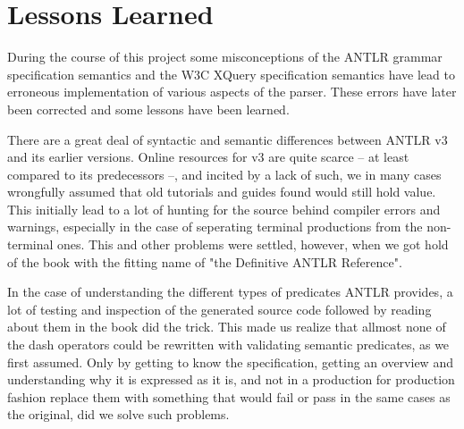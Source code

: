 \section{Lessons Learned}
\label{sect:discussion:deadEnds}
During the course of this project some misconceptions of the ANTLR grammar specification semantics and the W3C XQuery specification semantics have lead to erroneous implementation of various aspects of the parser. These errors have later been corrected and some lessons have been learned.

There are a great deal of syntactic and semantic differences between ANTLR v3 and its earlier versions. Online resources for v3 are quite scarce -- at least compared to its predecessors --, and incited by a lack of such, we in many cases wrongfully assumed that old tutorials and guides found would still hold value. This initially lead to a lot of hunting for the source behind compiler errors and warnings, especially in the case of seperating terminal productions from the non-terminal ones. This and other problems were settled, however, when we got hold of the book with the fitting name of "the Definitive ANTLR Reference"\cite{definitiveAntlr}.

In the case of understanding the different types of predicates ANTLR provides, a lot of testing and inspection of the generated source code followed by reading about them in the book did the trick. This made us realize that allmost none of the dash operators could be rewritten with validating semantic predicates, as we first assumed. Only by getting to know the specification, getting an overview and understanding why it is expressed as it is, and not in a production for production fashion replace them with something that would fail or pass in the same cases as the original, did we solve such problems.
